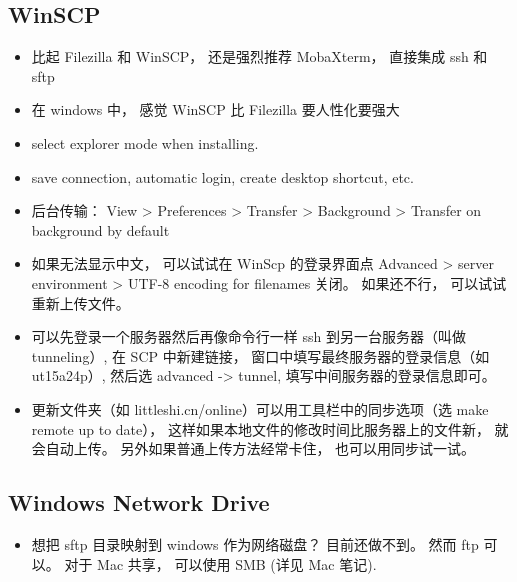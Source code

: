 \subsection{WinSCP}
\begin{itemize}
\item 比起 Filezilla 和 WinSCP， 还是强烈推荐 MobaXterm， 直接集成 ssh 和 sftp
\item 在 windows 中， 感觉 WinSCP 比 Filezilla 要人性化要强大
\item select explorer mode when installing.
\item save connection, automatic login, create desktop shortcut, etc.
\item 后台传输： View > Preferences > Transfer > Background > Transfer on background by default
\item 如果无法显示中文， 可以试试在 WinScp 的登录界面点 Advanced > server environment > UTF-8 encoding for filenames 关闭。 如果还不行， 可以试试重新上传文件。
\item 可以先登录一个服务器然后再像命令行一样 ssh 到另一台服务器（叫做 tunneling）, 在 SCP 中新建链接， 窗口中填写最终服务器的登录信息（如 ut15a24p）, 然后选 advanced -> tunnel, 填写中间服务器的登录信息即可。
\item 更新文件夹（如 littleshi.cn/online）可以用工具栏中的同步选项（选 make remote up to date）， 这样如果本地文件的修改时间比服务器上的文件新， 就会自动上传。 另外如果普通上传方法经常卡住， 也可以用同步试一试。
\end{itemize}

\subsection{Windows Network Drive}
\begin{itemize}
\item 想把 sftp 目录映射到 windows 作为网络磁盘？ 目前还做不到。 然而 ftp 可以。 对于 Mac 共享， 可以使用 SMB (详见 Mac 笔记).
\end{itemize}
